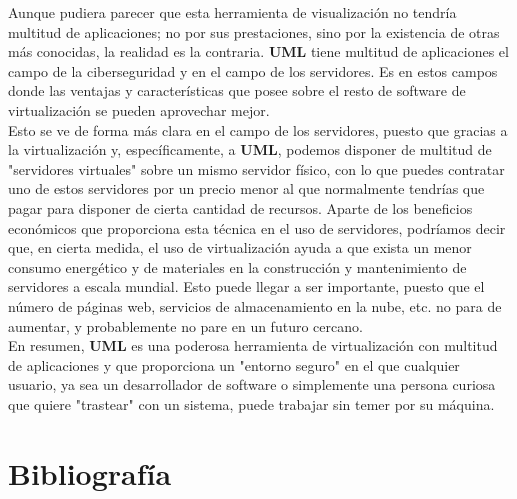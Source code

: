 \documentclass[11pt,twoside,titlepage,a4paper]{article}
\theoremstyle{definition}
\theoremstyle{plain_rojo}
\theoremstyle{remark}
\begin{document}
Aunque pudiera parecer que esta herramienta de visualización no tendría
multitud de aplicaciones; no por sus prestaciones, sino por la existencia de
otras más conocidas, la realidad es la contraria. \textbf{UML} tiene multitud
de aplicaciones el campo de la ciberseguridad y en el campo de los servidores.
Es en estos campos donde las ventajas y características que posee sobre el
resto de software de virtualización se pueden aprovechar mejor. 
\\

Esto se ve de forma más clara en el campo de los servidores, puesto que 
gracias a la virtualización y, específicamente, a \textbf{UML}, podemos 
disponer de multitud de "servidores virtuales" sobre un mismo servidor 
físico, con lo que puedes contratar uno de estos servidores por un precio 
menor al que normalmente tendrías que pagar para disponer de cierta cantidad 
de recursos. Aparte de los beneficios económicos que proporciona esta técnica 
en el uso de servidores, podríamos decir que, en cierta medida, el uso de 
virtualización ayuda a que exista un menor consumo energético y de materiales
en la construcción y mantenimiento de servidores a escala mundial. Esto puede
llegar a ser importante, puesto que el número de páginas web, servicios de
almacenamiento en la nube, etc. no para de aumentar, y probablemente no pare
en un futuro cercano.
\\

En resumen, \textbf{UML} es una poderosa herramienta de virtualización con
multitud de aplicaciones y que proporciona un "entorno seguro" en el que 
cualquier usuario, ya sea un desarrollador de software o simplemente una 
persona curiosa que quiere "trastear" con un sistema, puede trabajar sin temer
por su máquina.

\section{Bibliografía}
\end{document}
